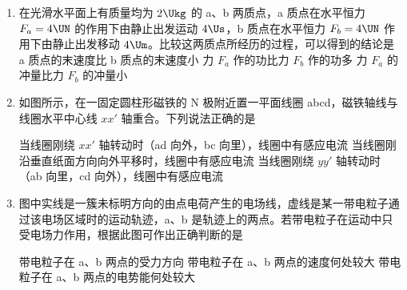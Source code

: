 \documentclass[\gkver]{gaokaozhenti}
\begin{document}
\begin{enumerate}

\item
在光滑水平面上有质量均为 $2\Ukg$ 的 a、b 两质点，a 质点在水平恒力 $F_{a} = 4\UN$ 的作用下由静止出发运动 $4\Us$，b 质点在水平恒力 $F_{b} = 4\UN$ 作用下由静止出发移动 $4\Um$。比较这两质点所经历的过程，可以得到的结论是
{a 质点的末速度比 b 质点的末速度小}
{力 $F_{a}$ 作的功比力 $F_{b}$ 作的功多}
{力 $F_{a}$ 的冲量比力 $F_{b}$ 的冲量小}


\item
如图所示，在一固定圆柱形磁铁的 N 极附近置一平面线圈 abcd，磁铁轴线与线圈水平中心线 $xx'$ 轴重合。下列说法正确的是

\onepicture[w=5.5cm]{}

{当线圈刚绕 $xx'$ 轴转动时（ad 向外，bc 向里），线圈中有感应电流}
{当线圈刚沿垂直纸面方向向外平移时，线圈中有感应电流}
{当线圈刚绕 $yy'$ 轴转动时（ab 向里，cd 向外），线圈中有感应电流}


\item
图中实线是一簇未标明方向的由点电荷产生的电场线，虚线是某一带电粒子通过该电场区域时的运动轨迹，a、b 是轨迹上的两点。若带电粒子在运动中只受电场力作用，根据此图可作出正确判断的是

\onepicture[w=4.5cm]{}

{带电粒子在 a、b 两点的受力方向}
{带电粒子在 a、b 两点的速度何处较大}
{带电粒子在 a、b 两点的电势能何处较大}



\end{enumerate}
\end{document}
